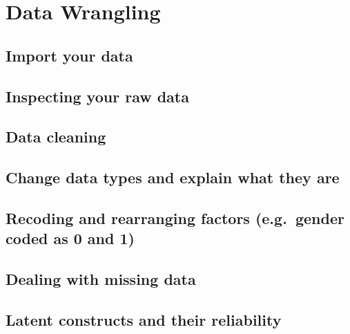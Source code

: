 \documentclass[
]{book}
\begin{document}
\hypertarget{data-wrangling}{%
\chapter{Data Wrangling}\label{data-wrangling}}

\hypertarget{import-your-data}{%
\section{Import your data}\label{import-your-data}}

\hypertarget{inspecting-your-raw-data}{%
\section{Inspecting your raw data}\label{inspecting-your-raw-data}}

\hypertarget{data-cleaning}{%
\section{Data cleaning}\label{data-cleaning}}

\hypertarget{change-data-types-and-explain-what-they-are}{%
\section{Change data types and explain what they are}\label{change-data-types-and-explain-what-they-are}}

\hypertarget{recoding-and-rearranging-factors-e.g.-gender-coded-as-0-and-1}{%
\section{Recoding and rearranging factors (e.g.~gender coded as 0 and 1)}\label{recoding-and-rearranging-factors-e.g.-gender-coded-as-0-and-1}}

\hypertarget{dealing-with-missing-data}{%
\section{Dealing with missing data}\label{dealing-with-missing-data}}

\hypertarget{latent-constructs-and-their-reliability}{%
\section{Latent constructs and their reliability}\label{latent-constructs-and-their-reliability}}
\end{document}
